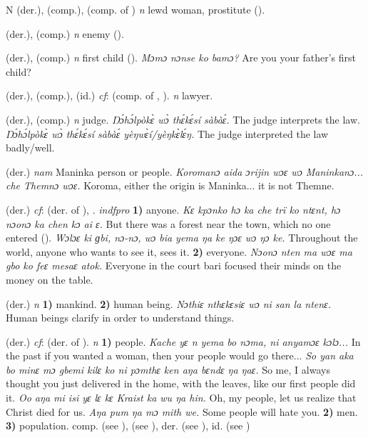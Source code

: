 \begin{letter}{N}
 (der.), (comp.), (comp. of ) \textit{n} lewd woman, prostitute (\citealt{Pichl1967}). 

 (der.), (comp.) \textit{n} enemy (\citealt{Pichl1967}).

 (der.), (comp.) \textit{n} first child (\citealt{Pichl1967}). \textit{Mɔmɔ nɔnse ko bamɔ?} Are you your father's first child?

 (der.), (comp.), (id.) \textit{cf}:  (comp. of , ). \textit{n} lawyer.

 (der.), (comp.) \textit{n} judge. \textit{Ŋɔ́hɔ́lpòkɛ̀ wɔ̀ thɛ́kɛ́sí sàbàɛ́.} The judge interprets the law. \textit{Ŋɔ́hɔ́lpòkɛ̀ wɔ̀ thɛ́kɛ́sí sàbàɛ́ yèŋwɛ̀í/yèŋkɛ̀lɛ́ŋ.} The judge interpreted the law badly/well.

 (der.) \textit{nam} Maninka person or people. \textit{Koromanɔ aida ɔrijin wɔɛ wɔ Maninkanɔ... che Themnɔ wɔɛ.} Koroma, either the origin is Maninka... it is not Themne. 

 (der.) \textit{cf}:  (der. of ), . \textit{indfpro} \textbf{1)} anyone. \textit{Kɛ kpɔnko hɔ ka che trï ko ntɛnt, hɔ nɔonɔ ka chen kɔ ai ɛ.} But there was a forest near the town, which no one entered (\citealt{Pichl1967}). \textit{Wɔlɔɛ ki ɡbi, nɔ-nɔ, wɔ bia yema ŋa ke ŋɔɛ wɔ ŋɔ ke.} Throughout the world, anyone who wants to see it, sees it. \textbf{2)} everyone. \textit{Nɔonɔ nten ma wɔɛ ma gbo ko feɛ mesaɛ atok.} Everyone in the court bari focused their minds on the money on the table.

 (der.) \textit{n} \textbf{1)} mankind. \textbf{2)} human being. \textit{Nɔthiɛ nthɛkɛsiɛ wɔ ni san la ntenɛ.} Human beings clarify in order to understand things. 

 (der.) \textit{cf}:  (der. of ). \textit{n} \textbf{1)} people. \textit{Kache yɛ n yema bo nɔma, ni anyamɔɛ kɔlɔ...} In the past if you wanted a woman, then your people would go there... \textit{So yan aka bo minɛ mɔ gbemi kilɛ ko ni pɔmthɛ ken aŋa bɛndɛ ŋa ŋaɛ.} So me, I always thought you just delivered in the home, with the leaves, like our first people did it. \textit{Oo aŋa mi isi yɛ lɛ kɛ Kraist ka wu ŋa hin.} Oh, my people, let us realize that Christ died for us. \textit{Aŋa pum ŋa mɔ mith we.} Some people will hate you. \textbf{2)} men. \textbf{3)} population. comp.  (see ),  (see ), der.  (see ), id.  (see )


\end{letter}
